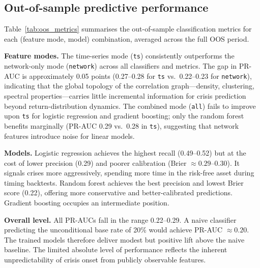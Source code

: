 \documentclass{article}
\begin{document}
\subsection{Out-of-sample predictive performance}
\label{sec:oos_metrics}

Table~\ref{tab:oos_metrics} summarises the out-of-sample classification metrics for each (feature mode, model) combination, averaged across the full OOS period.

\textbf{Feature modes.} The time-series mode (\texttt{ts}) consistently outperforms the network-only mode (\texttt{network}) across all classifiers and metrics. The gap in PR-AUC is approximately 0.05 points (0.27--0.28 for \texttt{ts} vs.\ 0.22--0.23 for \texttt{network}), indicating that the global topology of the correlation graph---density, clustering, spectral properties---carries little incremental information for crisis prediction beyond return-distribution dynamics. The combined mode (\texttt{all}) fails to improve upon \texttt{ts} for logistic regression and gradient boosting; only the random forest benefits marginally (PR-AUC 0.29 vs.\ 0.28 in \texttt{ts}), suggesting that network features introduce noise for linear models.

\textbf{Models.} Logistic regression achieves the highest recall (0.49--0.52) but at the cost of lower precision (0.29) and poorer calibration (Brier $\approx 0.29$--0.30). It signals crises more aggressively, spending more time in the risk-free asset during timing backtests. Random forest achieves the best precision and lowest Brier score (0.22), offering more conservative and better-calibrated predictions. Gradient boosting occupies an intermediate position.

\textbf{Overall level.} All PR-AUCs fall in the range 0.22--0.29. A naive classifier predicting the unconditional base rate of 20\% would achieve PR-AUC $\approx 0.20$. The trained models therefore deliver modest but positive lift above the naive baseline. The limited absolute level of performance reflects the inherent unpredictability of crisis onset from publicly observable features.
\end{document}
